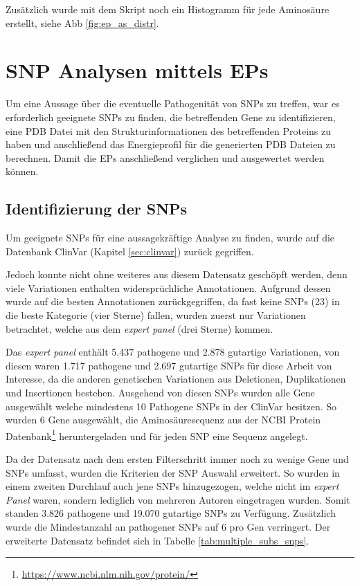 Zusätzlich wurde mit dem Skript noch ein Histogramm für jede Aminosäure erstellt, siehe \ac{Abb} \ref{fig:ep_as_distr}.



\section{SNP Analysen mittels EPs}
\label{sec:snp_analyse}

Um eine Aussage über die eventuelle Pathogenität von \ac{SNP}s zu treffen, war es erforderlich geeignete \ac{SNP}s zu finden, die betreffenden Gene zu identifizieren, eine \ac{PDB} Datei mit den Strukturinformationen des betreffenden Proteins zu haben und anschließend das Energieprofil für die generierten \ac{PDB} Dateien zu berechnen. Damit die \ac{EP}s anschließend verglichen und ausgewertet werden können.


\subsection{Identifizierung der SNPs}
\label{sec:clinvar_filter}

Um geeignete \ac{SNP}s für eine aussagekräftige Analyse zu finden, wurde auf die Datenbank ClinVar (Kapitel \ref{sec:clinvar}) zurück gegriffen.

Jedoch konnte nicht ohne weiteres aus diesem Datensatz geschöpft werden, denn viele Variationen enthalten widersprüchliche Annotationen. Aufgrund dessen wurde auf die besten Annotationen zurückgegriffen, da fast keine \ac{SNP}s (23) in die beste Kategorie (vier Sterne) fallen, wurden zuerst nur Variationen betrachtet, welche aus dem \emph{expert panel} (drei Sterne) kommen. 

Das \emph{expert panel} enthält 5.437 pathogene und 2.878 gutartige Variationen, von diesen waren 1.717 pathogene und 2.697 gutartige \ac{SNP}s für diese Arbeit von Interesse, da die anderen genetischen Variationen aus Deletionen, Duplikationen und Insertionen bestehen. Ausgehend von diesen \ac{SNP}s wurden alle Gene ausgewählt welche mindestens 10 Pathogene \ac{SNP}s in der ClinVar besitzen. So wurden 6 Gene ausgewählt, die Aminosäuresequenz aus der NCBI Protein Datenbank\footnote{\url{https://www.ncbi.nlm.nih.gov/protein/}} heruntergeladen und für jeden \ac{SNP} eine Sequenz angelegt. 

Da der Datensatz nach dem ersten Filterschritt immer noch zu wenige Gene und \ac{SNP}s umfasst, wurden die Kriterien der \ac{SNP} Auswahl erweitert. So wurden in einem zweiten Durchlauf auch jene \ac{SNP}s hinzugezogen, welche nicht im \emph{expert Panel} waren, sondern lediglich von mehreren Autoren eingetragen wurden. Somit standen 3.826 pathogene und 19.070 gutartige \ac{SNP}s zu Verfügung. Zusätzlich wurde die Mindestanzahl an pathogener SNPs auf 6 pro Gen verringert. Der erweiterte Datensatz befindet sich in Tabelle \ref{tab:multiple_subs_snps}.


